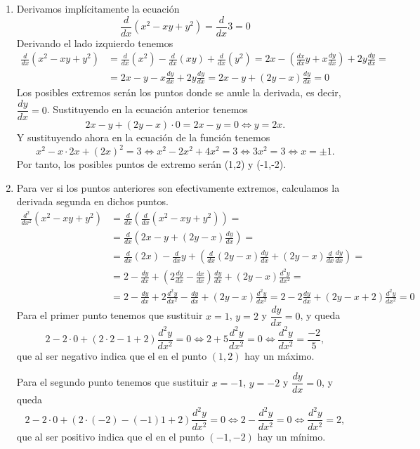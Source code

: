 {\begin{enumerate}
\item Derivamos implícitamente la ecuación
\[
\frac{d}{dx}(x^2-xy+y^2)=\frac{d}{dx}3=0
\]
Derivando el lado izquierdo tenemos
\begin{align*}
\frac{d}{dx}(x^2-xy+y^2)&=
\frac{d}{dx}(x^2)-\frac{d}{dx}(xy)+\frac{d}{dx}(y^2)=
2x-(\frac{dx}{dx}y+x\frac{dy}{dx})+2y\frac{dy}{dx}=\\
&=2x-y-x\frac{dy}{dx}+2y\frac{dy}{dx}
=2x-y+(2y-x)\frac{dy}{dx}=0
\end{align*}
Los posibles extremos serán los puntos donde se anule la derivada, es decir, $\dfrac{dy}{dx}=0$. Sustituyendo en la ecuación anterior tenemos
\[
2x-y+(2y-x)\cdot 0= 2x-y=0 \Leftrightarrow y=2x.
\]
Y sustituyendo ahora en la ecuación de la función tenemos
\[
x^2-x\cdot 2x+(2x)^2=3 \Leftrightarrow x^2-2x^2+4x^2=3 \Leftrightarrow 3x^2=3 \Leftrightarrow x=\pm1.
\]
Por tanto, los posibles puntos de extremo serán (1,2) y (-1,-2).

\item Para ver si los puntos anteriores son efectivamente extremos, calculamos la derivada segunda en dichos puntos. 
\begin{align*}
\frac{d^2}{dx^2}(x^2-xy+y^2)&=
\frac{d}{dx}\left(\frac{d}{dx}(x^2-xy+y^2)\right)=\\
&=\frac{d}{dx}\left(2x-y+(2y-x)\frac{dy}{dx}\right)=\\
&=\frac{d}{dx}(2x)-\frac{d}{dx}y+\left(\frac{d}{dx}(2y-x)\frac{dy}{dx}+(2y-x)\frac{d}{dx}\frac{dy}{dx}\right)=\\
&=2-\frac{dy}{dx}+\left(2\frac{dy}{dx}-\frac{dx}{dx}\right)\frac{dy}{dx}+(2y-x)\frac{d^2y}{dx^2}=\\
&= 2-\frac{dy}{dx}+2\frac{d^2y}{dx^2}-\frac{dy}{dx}+(2y-x)\frac{d^2y}{dx^2}=
2-2\frac{dy}{dx}+(2y-x+2)\frac{d^2y}{dx^2}=0
\end{align*}
Para el primer punto tenemos que sustituir $x=1$, $y=2$ y $\dfrac{dy}{dx}=0$, y queda
\[
2-2\cdot 0+(2\cdot 2-1+2)\frac{d^2y}{dx^2}=0 \Leftrightarrow 2+5\frac{d^2y}{dx^2}=0 \Leftrightarrow \frac{d^2y}{dx^2}=\frac{-2}{5},
\]
que al ser negativo indica que el en el punto $(1,2)$ hay un máximo.

Para el segundo punto tenemos que sustituir $x=-1$, $y=-2$ y $\dfrac{dy}{dx}=0$, y queda
\[
2-2\cdot 0+(2\cdot (-2)-(-1)1+2)\frac{d^2y}{dx^2}=0 \Leftrightarrow 2-\frac{d^2y}{dx^2}=0 \Leftrightarrow \frac{d^2y}{dx^2}=2,
\]
que al ser positivo indica que el en el punto $(-1,-2)$ hay un mínimo.
\end{enumerate}
}


